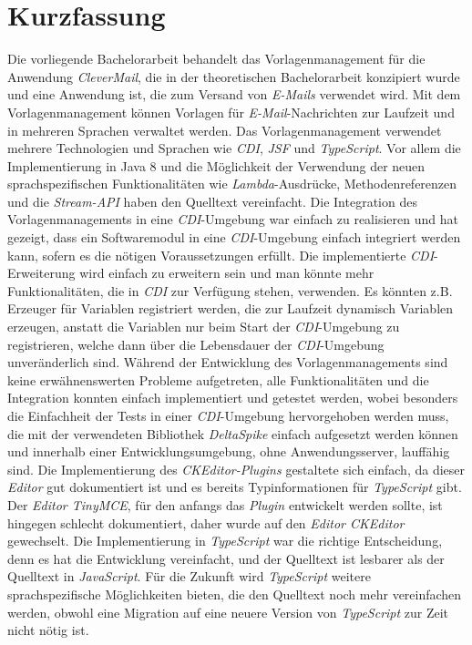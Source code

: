 \chapter{Kurzfassung}
Die vorliegende Bachelorarbeit behandelt das Vorlagenmanagement für die Anwendung \emph{CleverMail}, die in der theoretischen Bachelorarbeit konzipiert wurde und eine Anwendung ist, die zum Versand von \emph{E-Mails} verwendet wird. Mit dem Vorlagenmanagement können Vorlagen für \emph{E-Mail}-Nachrichten zur Laufzeit und in mehreren Sprachen verwaltet werden.
\newline
\newline
Das Vorlagenmanagement verwendet mehrere Technologien und Sprachen wie \emph{CDI}, \emph{JSF} und \emph{TypeScript}. Vor allem die Implementierung in Java 8 und die Möglichkeit der Verwendung der neuen sprachspezifischen Funktionalitäten wie \emph{Lambda}-Ausdrücke, Methodenreferenzen und die \emph{Stream-API} haben den Quelltext vereinfacht.
\newline
\newline
Die Integration des Vorlagenmanagements in eine \emph{CDI}-Umgebung war einfach zu realisieren und hat gezeigt, dass ein Softwaremodul in eine \emph{CDI}-Umgebung einfach integriert werden kann, sofern es die nötigen Voraussetzungen erfüllt. Die implementierte \emph{CDI}-Erweiterung wird einfach zu erweitern sein und man könnte mehr Funktionalitäten, die in \emph{CDI} zur Verfügung stehen, verwenden. Es könnten z.B. Erzeuger für Variablen registriert werden, die zur Laufzeit dynamisch Variablen erzeugen, anstatt die Variablen nur beim Start der \emph{CDI}-Umgebung zu registrieren, welche dann über die Lebensdauer der \emph{CDI}-Umgebung  unveränderlich sind. 
\newline
\newline
Während der Entwicklung des Vorlagenmanagements sind keine erwähnenswerten Probleme aufgetreten, alle Funktionalitäten und die Integration konnten einfach implementiert und getestet werden, wobei besonders die Einfachheit der Tests in einer \emph{CDI}-Umgebung hervorgehoben werden muss, die mit der verwendeten Bibliothek \emph{DeltaSpike} einfach aufgesetzt werden können und innerhalb einer Entwicklungsumgebung, ohne Anwendungsserver, lauffähig sind.
\newline
\newline
Die Implementierung des \emph{CKEditor-Plugins} gestaltete sich einfach, da dieser \emph{Editor} gut dokumentiert ist und es bereits Typinformationen für \emph{TypeScript} gibt. Der \emph{Editor TinyMCE}, für den anfangs das \emph{Plugin} entwickelt werden sollte, ist hingegen schlecht dokumentiert, daher wurde auf den \emph{Editor CKEditor} gewechselt. Die Implementierung in \emph{TypeScript} war die richtige Entscheidung, denn es hat die Entwicklung vereinfacht, und der Quelltext ist lesbarer als der Quelltext in \emph{JavaScript}. Für die Zukunft wird \emph{TypeScript} weitere sprachspezifische Möglichkeiten bieten, die den Quelltext noch mehr vereinfachen werden, obwohl eine Migration auf eine neuere Version von \emph{TypeScript} zur Zeit nicht nötig ist.